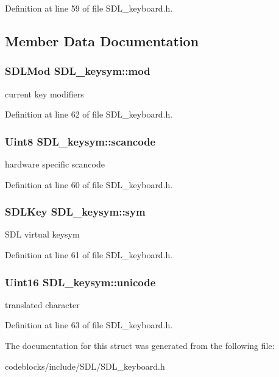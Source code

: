 Definition at line 59 of file S\+D\+L\+\_\+keyboard.\+h.



\subsection{Member Data Documentation}
\hypertarget{structSDL__keysym_ac5da46a4cf8aea69b0b1cb3f9224c91c}{
\subsubsection[{mod}]{\setlength{\rightskip}{0pt plus 5cm}S\+D\+L\+Mod S\+D\+L\+\_\+keysym\+::mod}}\label{structSDL__keysym_ac5da46a4cf8aea69b0b1cb3f9224c91c}
current key modifiers 

Definition at line 62 of file S\+D\+L\+\_\+keyboard.\+h.

\hypertarget{structSDL__keysym_a1ea71b1de132939909302dc14e5f468c}{
\subsubsection[{scancode}]{\setlength{\rightskip}{0pt plus 5cm}Uint8 S\+D\+L\+\_\+keysym\+::scancode}}\label{structSDL__keysym_a1ea71b1de132939909302dc14e5f468c}
hardware specific scancode 

Definition at line 60 of file S\+D\+L\+\_\+keyboard.\+h.

\hypertarget{structSDL__keysym_a2a22c7afc8239b19cd18dda3aa26b70c}{
\subsubsection[{sym}]{\setlength{\rightskip}{0pt plus 5cm}S\+D\+L\+Key S\+D\+L\+\_\+keysym\+::sym}}\label{structSDL__keysym_a2a22c7afc8239b19cd18dda3aa26b70c}
S\+D\+L virtual keysym 

Definition at line 61 of file S\+D\+L\+\_\+keyboard.\+h.

\hypertarget{structSDL__keysym_a683a8e5de4e6dc6de95f670f6275cb0c}{
\subsubsection[{unicode}]{\setlength{\rightskip}{0pt plus 5cm}Uint16 S\+D\+L\+\_\+keysym\+::unicode}}\label{structSDL__keysym_a683a8e5de4e6dc6de95f670f6275cb0c}
translated character 

Definition at line 63 of file S\+D\+L\+\_\+keyboard.\+h.



The documentation for this struct was generated from the following file\+:\begin{DoxyCompactItemize}
\item 
codeblocks/include/\+S\+D\+L/S\+D\+L\+\_\+keyboard.\+h\end{DoxyCompactItemize}

